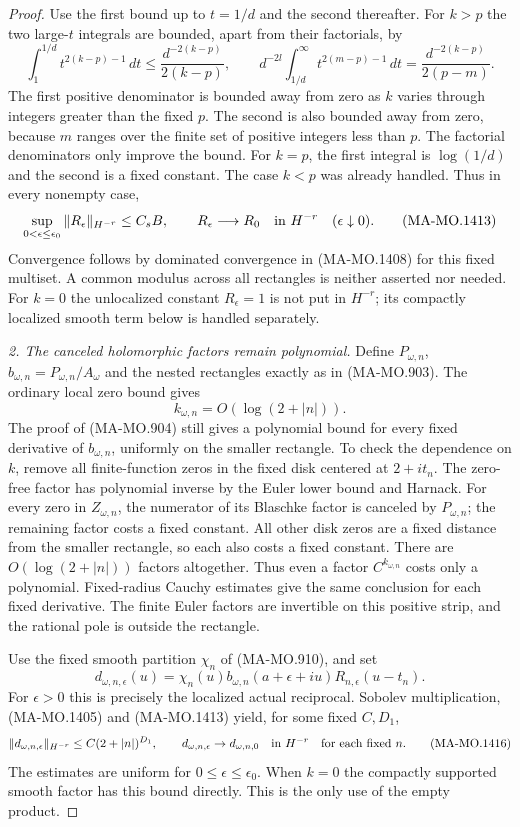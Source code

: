 \begin{proof}
Use the first bound up to $t=1/d$ and the second thereafter.
For $k>p$ the two large-$t$ integrals are bounded, apart from
their factorials, by
\[
 \int_1^{1/d}t^{2(k-p)-1}\,dt
       \le\frac{d^{-2(k-p)}}{2(k-p)},\qquad
 d^{-2l}\int_{1/d}^\infty t^{2(m-p)-1}\,dt
       =\frac{d^{-2(k-p)}}{2(p-m)}.
 \tag{MA-MO.1412}
\]
The first positive denominator is bounded away from zero
as $k$ varies through integers greater than the fixed $p$.
The second is also bounded away from zero, because $m$ ranges
over the finite set of positive integers less than $p$.
The factorial denominators only improve the bound.
For $k=p$, the first integral is $\log(1/d)$ and the second
is a fixed constant.  The case $k<p$ was already handled.
Thus in every nonempty case,
\[
 \sup_{0<\epsilon\le\epsilon_0}\|R_\epsilon\|_{H^{-r}}
          \le C_s B,\qquad
 R_\epsilon\longrightarrow R_0\quad\hbox{in }H^{-r}
                              \quad(\epsilon\downarrow0).
 \tag{MA-MO.1413}
\]
Convergence follows by dominated convergence in (MA-MO.1408)
for this fixed multiset.  A common modulus across all rectangles
is neither asserted nor needed.
For $k=0$ the unlocalized constant $R_\epsilon=1$ is not
put in $H^{-r}$; its compactly localized smooth term below
is handled separately.

\emph{2. The canceled holomorphic factors remain polynomial.}
Define $P_{\omega,n}$, $b_{\omega,n}=P_{\omega,n}/A_\omega$
and the nested rectangles exactly as in (MA-MO.903).
The ordinary local zero bound gives
\[
                    k_{\omega,n}=O(\log(2+|n|)).
 \tag{MA-MO.1414}
\]
The proof of (MA-MO.904) still gives a polynomial bound
for every fixed derivative of $b_{\omega,n}$, uniformly on
the smaller rectangle.  To check the dependence on $k$, remove
all finite-function zeros in the fixed disk centered at $2+it_n$.
The zero-free factor has polynomial inverse by the Euler lower
bound and Harnack.  For every zero in $Z_{\omega,n}$, the
numerator of its Blaschke factor is canceled by $P_{\omega,n}$;
the remaining factor costs a fixed constant.  All other disk
zeros are a fixed distance from the smaller rectangle, so each
also costs a fixed constant.  There are $O(\log(2+|n|))$
factors altogether.  Thus even a factor $C^{k_{\omega,n}}$
costs only a polynomial.  Fixed-radius Cauchy estimates give
the same conclusion for each fixed derivative.  The finite
Euler factors are invertible on this positive strip, and the
rational pole is outside the rectangle.

Use the fixed smooth partition $\chi_n$ of (MA-MO.910), and set
\[
 d_{\omega,n,\epsilon}(u)
   =\chi_n(u)b_{\omega,n}(a+\epsilon+iu)
                              R_{n,\epsilon}(u-t_n).
 \tag{MA-MO.1415}
\]
For $\epsilon>0$ this is precisely the localized actual
reciprocal.  Sobolev multiplication, (MA-MO.1405) and
(MA-MO.1413) yield, for some fixed $C,D_1$,
\[
 \|d_{\omega,n,\epsilon}\|_{H^{-r}}\le C(2+|n|)^{D_1},\qquad
 d_{\omega,n,\epsilon}\to d_{\omega,n,0}\quad\hbox{in }H^{-r}
                         \quad\text{for each fixed }n.
 \tag{MA-MO.1416}
\]
The estimates are uniform for $0\le\epsilon\le\epsilon_0$.
When $k=0$ the compactly supported smooth factor has this
bound directly.  This is the only use of the empty product.


\end{proof}
